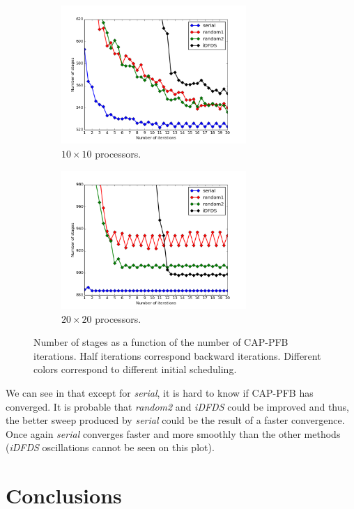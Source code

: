 \documentclass{mc2015}
\renewcommand{\(}{\left(}
\renewcommand{\)}{\right)}
\renewcommand{\[}{\left[}
\renewcommand{\]}{\right]}
\begin{document}
\begin{figure}[H]
  \begin{subfigure}[b]{.5\textwidth}
    \centering
    \includegraphics[width=7cm]{convergence_band_20_20}
    \caption{$10\times 10$ processors.}
    \label{cb_10_10}
  \end{subfigure}
  \begin{subfigure}[b]{.5\textwidth}
    \centering
    \includegraphics[width=7cm]{convergence_band_40_40}
    \caption{$20\times 20$ processors.}
  \end{subfigure}
  \caption{Number of stages as a function of the number of CAP-PFB iterations.
  Half iterations correspond backward iterations. Different colors correspond to
  different initial scheduling.}
  \label{convergence_band}
\end{figure}
 
We can see in  that except for \emph{serial}, it is hard to know
if CAP-PFB has converged. It is probable that \emph{random2} and \emph{iDFDS} could be
improved and thus, the better sweep produced by \emph{serial} could be the
result of a faster convergence. Once again \emph{serial} converges faster and
more smoothly than the other methods (\emph{iDFDS} oscillations cannot be seen
on this plot).

\section{Conclusions} \label{conclusions}
\end{document}
